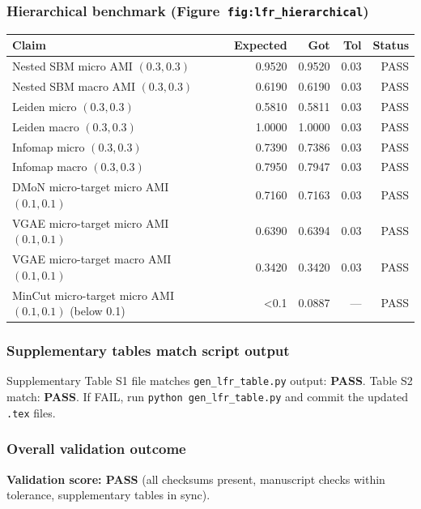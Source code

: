 \subsubsection{Hierarchical benchmark (Figure~\texttt{fig:lfr\_hierarchical})}
\begin{tabular}{p{7.2cm}rrrr}
\toprule
Claim & Expected & Got & Tol & Status \\
\midrule
Nested SBM micro AMI $(0.3,0.3)$ & 0.9520 & 0.9520 & 0.03 & PASS \\
Nested SBM macro AMI $(0.3,0.3)$ & 0.6190 & 0.6190 & 0.03 & PASS \\
Leiden micro $(0.3,0.3)$ & 0.5810 & 0.5811 & 0.03 & PASS \\
Leiden macro $(0.3,0.3)$ & 1.0000 & 1.0000 & 0.03 & PASS \\
Infomap micro $(0.3,0.3)$ & 0.7390 & 0.7386 & 0.03 & PASS \\
Infomap macro $(0.3,0.3)$ & 0.7950 & 0.7947 & 0.03 & PASS \\
DMoN micro-target micro AMI $(0.1,0.1)$ & 0.7160 & 0.7163 & 0.03 & PASS \\
VGAE micro-target micro AMI $(0.1,0.1)$ & 0.6390 & 0.6394 & 0.03 & PASS \\
VGAE micro-target macro AMI $(0.1,0.1)$ & 0.3420 & 0.3420 & 0.03 & PASS \\
MinCut micro-target micro AMI $(0.1,0.1)$ (below 0.1) & <0.1 & 0.0887 & --- & PASS \\
\bottomrule
\end{tabular}
\subsubsection{Supplementary tables match script output}
Supplementary Table S1 file matches \texttt{gen\_lfr\_table.py} output: \textbf{PASS}. Table S2 match: \textbf{PASS}. If FAIL, run \texttt{python gen\_lfr\_table.py} and commit the updated \texttt{.tex} files.
\subsubsection{Overall validation outcome}
\textbf{Validation score: PASS} (all checksums present, manuscript checks within tolerance, supplementary tables in sync).
